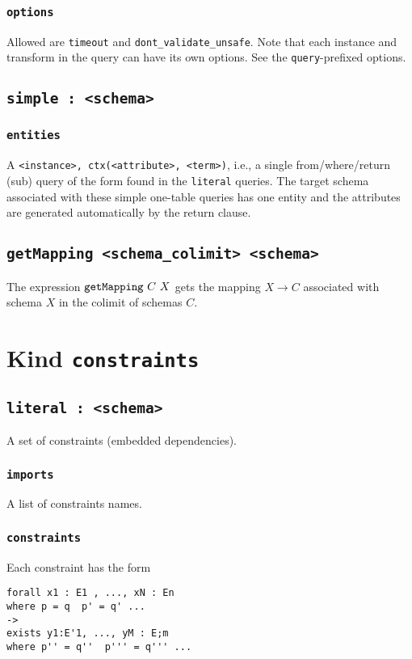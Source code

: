 \documentclass[10pt]{book}
\begin{document}
\subsection{{\tt options}}
Allowed are {\tt timeout} and {\tt dont\_validate\_unsafe}.  Note that each instance and transform in the query can have its own options.  See the {\tt query}-prefixed options.

\section{{\tt simple : <schema>}} 

\subsection{{\tt entities}}
A {\tt <instance>, ctx(<attribute>, <term>)}, i.e., a single from/where/return (sub) query of the form found in the {\tt literal} queries.  The target schema associated with these simple one-table queries has one entity and the attributes are generated automatically by the return clause. 

\section{{\tt getMapping <schema\_colimit> <schema>}}

The expression ${\tt getMapping} \ C \ X$ gets the mapping $X \to C$ associated with schema $X$ in the colimit of schemas $C$.

\chapter{Kind {\tt constraints}}

\section{{\tt literal : <schema>}}

A set of constraints (embedded dependencies). 

\subsection{{\tt imports}}
A list of constraints names.

\subsection{{\tt constraints}}
 Each constraint has the form
\begin{verbatim}
forall x1 : E1 , ..., xN : En 
where p = q  p' = q' ...
->
exists y1:E'1, ..., yM : E;m 
where p'' = q''  p''' = q''' ...
\end{verbatim}
\end{document}
